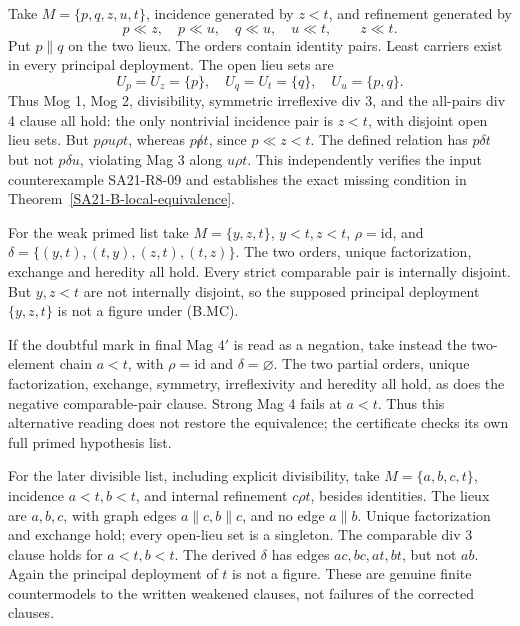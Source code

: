 \begin{counterexample}
\label{SA21-B-missing-transitivity}
Take \(M=\{p,q,z,u,t\}\), incidence generated by \(z<t\), and
refinement generated by
\[
 p\ll z,\quad p\ll u,\quad q\ll u,\quad u\ll t,
 \qquad z\ll t.
\]
Put \(p\parallel q\) on the two lieux. The orders contain identity
pairs. Least carriers exist in every principal deployment. The open
lieu sets are
\[
 U_p=U_z=\{p\},\quad U_q=U_t=\{q\},\quad U_u=\{p,q\}.
\]
Thus Mog 1, Mog 2, divisibility, symmetric irreflexive div 3, and
the all-pairs div 4 clause all hold: the only nontrivial incidence
pair is \(z<t\), with disjoint open lieu sets.
But \(p\rho u\rho t\), whereas \(p\not\rho t\), since \(p\ll z<t\).
The defined relation has \(p\delta t\) but not \(p\delta u\), violating
Mag 3 along \(u\rho t\). This independently verifies the input
counterexample SA21-R8-09 and establishes the exact missing condition
in Theorem~\ref{SA21-B-local-equivalence}.
\end{counterexample}

\begin{counterexample}
\label{SA21-B-weak-primed}
For the weak primed list take \(M=\{y,z,t\}\),
\(y<t,z<t\), \(\rho=\mathrm{id}\), and
\(\delta=\{(y,t),(t,y),(z,t),(t,z)\}\).
The two orders, unique factorization, exchange and heredity all hold.
Every strict comparable pair is internally disjoint. But \(y,z<t\)
are not internally disjoint, so the supposed principal deployment
\(\{y,z,t\}\) is not a figure under (B.MC).

If the doubtful mark in final Mag \(4'\) is read as a negation,
take instead the two-element chain \(a<t\), with
\(\rho=\mathrm{id}\) and \(\delta=\varnothing\).
The two partial orders, unique factorization, exchange, symmetry,
irreflexivity and heredity all hold, as does the negative
comparable-pair clause. Strong Mag 4 fails at \(a<t\).
Thus this alternative reading does not restore the equivalence;
the certificate checks its own full primed hypothesis list.

For the later divisible list, including explicit divisibility, take
\(M=\{a,b,c,t\}\), incidence \(a<t,b<t\), and internal refinement
\(c\rho t\), besides identities. The lieux are \(a,b,c\), with graph
edges \(a\parallel c,b\parallel c\), and no edge \(a\parallel b\).
Unique factorization and exchange hold; every open-lieu set is a
singleton. The comparable div 3 clause holds for \(a<t,b<t\).
The derived \(\delta\) has edges
\(ac,bc,at,bt\), but not \(ab\). Again the principal deployment
of \(t\) is not a figure. These are genuine finite countermodels to
the written weakened clauses, not failures of the corrected clauses.
\end{counterexample}

